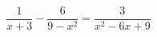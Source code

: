 \begin{ex}[type=equation]
	\begin{condition}
		\( \dfrac{1}{x+3}-\dfrac{6}{9-x^2}=\dfrac{3}{x^2-6x+9} \)
	\end{condition}
\end{ex}